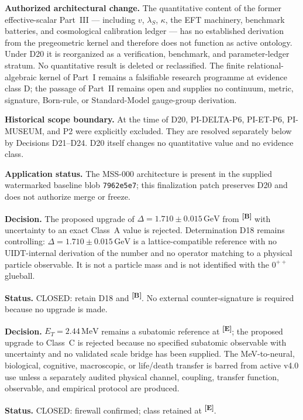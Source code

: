 \documentclass[12pt,a4paper,twoside]{article}
\theoremstyle{plain}
\theoremstyle{definition}
\theoremstyle{remark}
\newcommand{\GeV}{\,\mathrm{GeV}}
\newcommand{\MeV}{\,\mathrm{MeV}}
\newcommand{\catmark}[1]{\textsuperscript{\textsf{\textbf{[#1]}}}}
\newcommand{\DeltaGap}{1.710 \pm 0.015\GeV} %
\newcommand{\ETorsion}{2.44\MeV} %
\begin{document}
\begin{pioverridebox}
\label{box:pi-decision-d20}
\textbf{Authorized architectural change.} The quantitative content of the
former effective-scalar Part~III --- including $v$, $\lambda_S$, $\kappa$,
the EFT machinery, benchmark batteries, and cosmological calibration ledger
--- has no established derivation from the pregeometric kernel and therefore
does not function as active ontology. Under D20 it is reorganized as a
verification, benchmark, and parameter-ledger stratum. No quantitative result
is deleted or reclassified. The finite relational-algebraic kernel of Part~I
remains a falsifiable research programme at evidence class D; the passage of
Part~II remains open and supplies no continuum, metric, signature, Born-rule,
or Standard-Model gauge-group derivation.

\textbf{Historical scope boundary.} At the time of D20,
PI-DELTA-P6, PI-ET-P6, PI-MUSEUM, and P2 were explicitly excluded. They are
resolved separately below by Decisions D21--D24. D20 itself changes no
quantitative value and no evidence class.

\textbf{Application status.} The MSS-000 architecture is present in the
supplied watermarked baseline blob \texttt{7962e5e7}; this finalization patch
preserves D20 and does not authorize merge or freeze.
\end{pioverridebox}

\begin{pioverridebox}
\label{box:pi-decision-d21-delta}
\textbf{Decision.} The proposed upgrade of $\Delta=\DeltaGap$ from
\catmark{B} with uncertainty to an exact Class~A value is rejected.
Determination D18 remains controlling: $\Delta=1.710\pm0.015\,\mathrm{GeV}$
is a lattice-compatible reference with no UIDT-internal derivation of the
number and no operator matching to a physical particle observable. It is not
a particle mass and is not identified with the $0^{++}$ glueball.

\textbf{Status.} CLOSED: retain D18 and \catmark{B}. No external
counter-signature is required because no upgrade is made.
\end{pioverridebox}

\begin{pioverridebox}
\label{box:pi-decision-d22-et}
\textbf{Decision.} $E_T=\ETorsion$ remains a subatomic reference at
\catmark{E}; the proposed upgrade to Class~C is rejected because no
specified subatomic observable with uncertainty and no validated scale bridge
has been supplied. The MeV-to-neural, biological, cognitive, macroscopic, or
life/death transfer is barred from active v4.0 use unless a separately audited
physical channel, coupling, transfer function, observable, and empirical
protocol are produced.

\textbf{Status.} CLOSED: firewall confirmed; class retained at \catmark{E}.
\end{pioverridebox}
\end{document}
